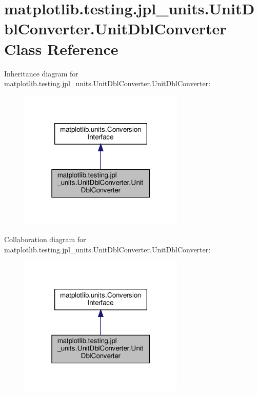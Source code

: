 \hypertarget{classmatplotlib_1_1testing_1_1jpl__units_1_1UnitDblConverter_1_1UnitDblConverter}{}\section{matplotlib.\+testing.\+jpl\+\_\+units.\+Unit\+Dbl\+Converter.\+Unit\+Dbl\+Converter Class Reference}
\label{classmatplotlib_1_1testing_1_1jpl__units_1_1UnitDblConverter_1_1UnitDblConverter}


Inheritance diagram for matplotlib.\+testing.\+jpl\+\_\+units.\+Unit\+Dbl\+Converter.\+Unit\+Dbl\+Converter\+:
\nopagebreak
\begin{figure}[H]
\begin{center}
\leavevmode
\includegraphics[width=223pt]{classmatplotlib_1_1testing_1_1jpl__units_1_1UnitDblConverter_1_1UnitDblConverter__inherit__graph}
\end{center}
\end{figure}


Collaboration diagram for matplotlib.\+testing.\+jpl\+\_\+units.\+Unit\+Dbl\+Converter.\+Unit\+Dbl\+Converter\+:
\nopagebreak
\begin{figure}[H]
\begin{center}
\leavevmode
\includegraphics[width=223pt]{classmatplotlib_1_1testing_1_1jpl__units_1_1UnitDblConverter_1_1UnitDblConverter__coll__graph}
\end{center}
\end{figure}
